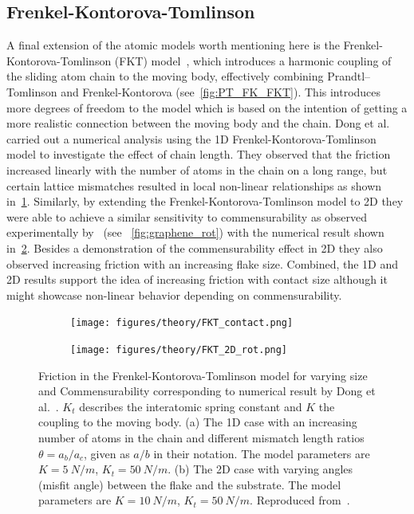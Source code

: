 \subsection{Frenkel-Kontorova-Tomlinson}
A final extension of the atomic models worth mentioning here is the
Frenkel-Kontorova-Tomlinson (\acrshort{FKT}) model~\cite{weiss_dry_1997}, which
introduces a harmonic coupling of the sliding atom chain to the moving body,
effectively combining Prandtl–Tomlinson and Frenkel-Kontorova
(see~\cref{fig:PT_FK_FKT}). This introduces more degrees of freedom to the model
which is based on the intention of getting a more realistic connection between
the moving body and the chain. Dong et al.~\cite{Yalin_2011} carried out a numerical analysis
using the 1D Frenkel-Kontorova-Tomlinson model to investigate the effect of
chain length. They observed that the friction increased linearly with the number
of atoms in the chain on a long range, but certain lattice mismatches resulted in
local non-linear relationships as shown in~\cref{fig:FKT_contact}. Similarly, by
extending the Frenkel-Kontorova-Tomlinson model to 2D they were able to achieve
a similar sensitivity to commensurability as observed experimentally
by~\cite{DIENWIEBEL2005197} (see ~\cref{fig:graphene_rot}) with the numerical
result shown in~\cref{fig:FKT_2D_rot}. Besides a demonstration of the
commensurability effect in 2D they also observed increasing friction with an
increasing flake size. Combined, the 1D and 2D results support the idea of
increasing friction with contact size although it might showcase non-linear
behavior depending on commensurability.


\begin{figure}[!htb]
  \centering
  \begin{subfigure}[t]{0.49\textwidth}
      \centering
      \texttt{[image: figures/theory/FKT\_contact.png]}
      \label{fig:FKT_contact}
  \end{subfigure}
  \hfill
  \begin{subfigure}[t]{0.49\textwidth}
      \centering
      \texttt{[image: figures/theory/FKT\_2D\_rot.png]}
      \label{fig:FKT_2D_rot}
    \end{subfigure}
    \hfill
     \caption{Friction in the Frenkel-Kontorova-Tomlinson model for varying size and Commensurability corresponding to numerical result by Dong et al.~\cite{Yalin_2011}. $K_t$ describes the interatomic spring constant and $K$ the coupling to the moving body. (a) The 1D case with an increasing number of atoms in the chain and different mismatch length ratios $\theta = a_b / a_c$, given as $a/b$ in their notation. The model parameters are $K = \SI{5}{N/m}$, $K_t = \SI{50}{N/m}$. (b) The 2D case with varying angles (misfit angle) between the flake and the substrate. The model parameters are $K = \SI{10}{N/m}$, $K_t = \SI{50}{N/m}$. Reproduced from~\cite{Yalin_2011}.}
     \label{fig:FKT_size}
\end{figure}


